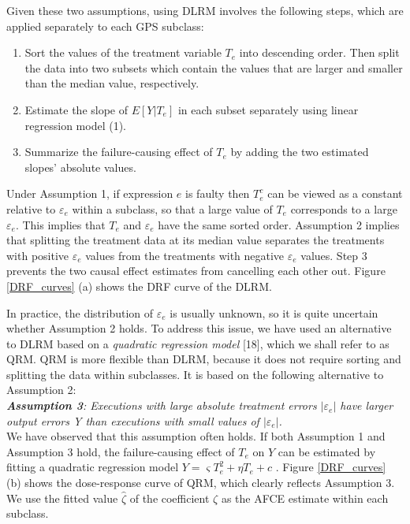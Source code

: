Given these two assumptions, using DLRM involves the following steps, which are applied separately to each GPS subclass:
\begin{enumerate}
\item Sort the values of the treatment variable $T_e$ into descending order.  Then split the data into two subsets which contain the values that are larger and smaller than the median value, respectively.
\item 	Estimate the slope of $E[Y|T_e]$ in each subset separately using linear regression model (1).
\item 	Summarize the failure-causing effect of $T_e$ by adding the two estimated slopes’ absolute values.
\end{enumerate}
Under Assumption 1, if expression $e$ is faulty then $T_e^c$ can be viewed as a constant relative to $\varepsilon_e$ within a subclass, so that a large value of $T_e$ corresponds to a large $\varepsilon_e$.  This implies that  $T_e$   and $\varepsilon_e$ have the same sorted order. Assumption 2 implies that splitting the treatment data at its median value separates the treatments with positive $\varepsilon_e$ values from the treatments with negative $\varepsilon_e$ values.  Step 3 prevents the two causal effect estimates from cancelling each other out. Figure \ref{DRF_curves} (a) shows the DRF curve of the DLRM.

In practice, the distribution of $\varepsilon_e$  is usually unknown, so it is quite uncertain whether Assumption 2 holds.  To address this issue, we have used an alternative to DLRM based on a {\it quadratic regression model} [18], which we shall refer to as QRM.   QRM is more flexible than DLRM, because it does not require sorting and splitting the data within subclasses.  It is based on the following alternative to Assumption 2:\\
\newline
\textit{ \textbf{ Assumption 3}: Executions with large absolute treatment errors $\left| {{\varepsilon _e}} \right|$ have larger output errors Y than executions with small values of $\left| {{\varepsilon _e}} \right|$.}\\
\newline
We have observed that this assumption often holds.  If both Assumption 1 and Assumption 3 hold, the failure-causing effect of $T_e$ on $Y$ can be estimated by fitting a quadratic regression model $Y = \varsigma T_e^2 + \eta {T_e} + c$  . Figure \ref{DRF_curves} (b) shows the dose-response curve of QRM, which clearly reflects Assumption 3.  We use the fitted value $\hat \zeta $ of the coefficient $ \zeta $ as the AFCE estimate within each subclass.
\vspace{-0.1cm}

